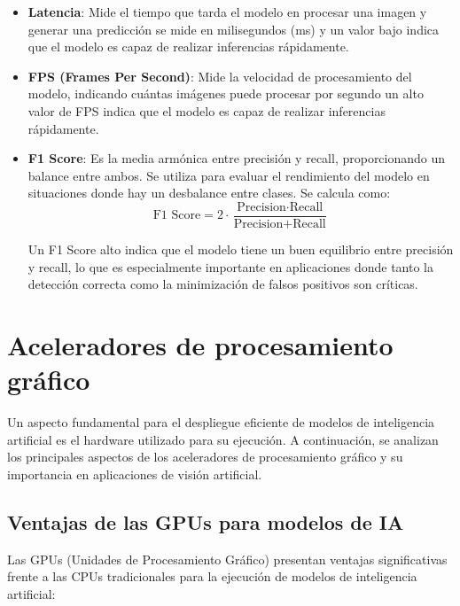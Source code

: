 \documentclass[11pt,spanish,listoffigures,listoftables]{tfgetsinf}
\begin{document}
\begin{itemize}
   \item \textbf{Latencia}: Mide el tiempo que tarda el modelo en procesar una imagen y generar una predicción se mide en milisegundos (ms) y un valor bajo indica que el modelo es capaz de realizar inferencias rápidamente.
   
   \item \textbf{FPS (Frames Per Second)}: Mide la velocidad de procesamiento del modelo, indicando cuántas imágenes puede procesar por segundo un alto valor de FPS indica que el modelo es capaz de realizar inferencias rápidamente.
   \item \textbf{F1 Score}: Es la media armónica entre precisión y recall, proporcionando un balance entre ambos. Se utiliza para evaluar el rendimiento del modelo en situaciones donde hay un desbalance entre clases. Se calcula como:
   \[
   \text{F1 Score} = 2 \cdot \frac{\text{Precision} \cdot \text{Recall}}{\text{Precision} + \text{Recall}}
   \]

   Un F1 Score alto indica que el modelo tiene un buen equilibrio entre precisión y recall, lo que es especialmente importante en aplicaciones donde tanto la detección correcta como la minimización de falsos positivos son críticas.

\end{itemize}


\section{Aceleradores de procesamiento gráfico}

Un aspecto fundamental para el despliegue eficiente de modelos de inteligencia artificial es el hardware utilizado para su ejecución. A continuación, se analizan los principales aspectos de los aceleradores de procesamiento gráfico y su importancia en aplicaciones de visión artificial.

\subsection{Ventajas de las GPUs para modelos de IA}
Las GPUs (Unidades de Procesamiento Gráfico) presentan ventajas significativas frente a las CPUs tradicionales para la ejecución de modelos de inteligencia artificial:
\end{document}
